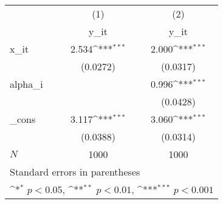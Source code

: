 {
\def\sym#1{\ifmmode^{#1}\else\(^{#1}\)\fi}
\begin{tabular}{l*{2}{c}}
\hline\hline
            &\multicolumn{1}{c}{(1)}&\multicolumn{1}{c}{(2)}\\
            &\multicolumn{1}{c}{y\_it}&\multicolumn{1}{c}{y\_it}\\
\hline
x\_it        &       2.534\sym{***}&       2.000\sym{***}\\
            &    (0.0272)         &    (0.0317)         \\
[1em]
alpha\_i     &                     &       0.996\sym{***}\\
            &                     &    (0.0428)         \\
[1em]
\_cons      &       3.117\sym{***}&       3.060\sym{***}\\
            &    (0.0388)         &    (0.0314)         \\
\hline
\(N\)       &        1000         &        1000         \\
\hline\hline
\multicolumn{3}{l}{\footnotesize Standard errors in parentheses}\\
\multicolumn{3}{l}{\footnotesize \sym{*} \(p<0.05\), \sym{**} \(p<0.01\), \sym{***} \(p<0.001\)}\\
\end{tabular}
}
